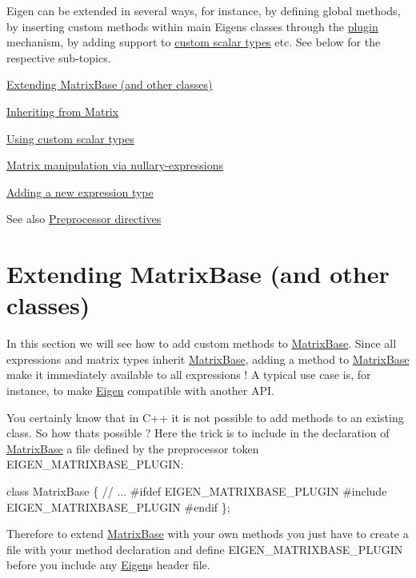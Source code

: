Eigen can be extended in several ways, for instance, by defining global methods, by inserting custom methods within main Eigen\textquotesingle{}s classes through the \hyperlink{TopicCustomizing_Plugins}{plugin} mechanism, by adding support to \hyperlink{TopicCustomizing_CustomScalar}{custom scalar types} etc. See below for the respective sub-\/topics.
\begin{DoxyItemize}
\item \hyperlink{TopicCustomizing_Plugins}{Extending Matrix\+Base (and other classes)}
\item \hyperlink{TopicCustomizing_InheritingMatrix}{Inheriting from Matrix}
\item \hyperlink{TopicCustomizing_CustomScalar}{Using custom scalar types}
\item \hyperlink{TopicCustomizing_NullaryExpr}{Matrix manipulation via nullary-\/expressions}
\item \hyperlink{TopicNewExpressionType}{Adding a new expression type} \begin{DoxySeeAlso}{See also}
\hyperlink{TopicPreprocessorDirectives}{Preprocessor directives} 
\end{DoxySeeAlso}

\end{DoxyItemize}\hypertarget{TopicCustomizing_Plugins}{}\section{Extending Matrix\+Base (and other classes)}\label{TopicCustomizing_Plugins}
In this section we will see how to add custom methods to \hyperlink{group___core___module_class_eigen_1_1_matrix_base}{Matrix\+Base}. Since all expressions and matrix types inherit \hyperlink{group___core___module_class_eigen_1_1_matrix_base}{Matrix\+Base}, adding a method to \hyperlink{group___core___module_class_eigen_1_1_matrix_base}{Matrix\+Base} make it immediately available to all expressions ! A typical use case is, for instance, to make \hyperlink{namespace_eigen}{Eigen} compatible with another A\+PI.

You certainly know that in C++ it is not possible to add methods to an existing class. So how that\textquotesingle{}s possible ? Here the trick is to include in the declaration of \hyperlink{group___core___module_class_eigen_1_1_matrix_base}{Matrix\+Base} a file defined by the preprocessor token {\ttfamily E\+I\+G\+E\+N\+\_\+\+M\+A\+T\+R\+I\+X\+B\+A\+S\+E\+\_\+\+P\+L\+U\+G\+IN\+:} 
\begin{DoxyCode}
\textcolor{keyword}{class }MatrixBase \{
  \textcolor{comment}{// ...}
\textcolor{preprocessor}{  #ifdef EIGEN\_MATRIXBASE\_PLUGIN}
\textcolor{preprocessor}{  #include EIGEN\_MATRIXBASE\_PLUGIN}
\textcolor{preprocessor}{  #endif}
\textcolor{preprocessor}{\};}
\end{DoxyCode}
 Therefore to extend \hyperlink{group___core___module_class_eigen_1_1_matrix_base}{Matrix\+Base} with your own methods you just have to create a file with your method declaration and define E\+I\+G\+E\+N\+\_\+\+M\+A\+T\+R\+I\+X\+B\+A\+S\+E\+\_\+\+P\+L\+U\+G\+IN before you include any \hyperlink{namespace_eigen}{Eigen}\textquotesingle{}s header file.

